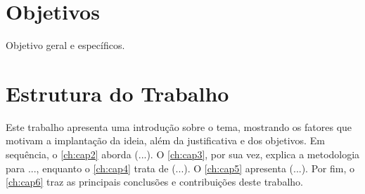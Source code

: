\section{Objetivos}
Objetivo geral e específicos.

\section{Estrutura do Trabalho}
Este trabalho apresenta uma introdução sobre o tema, mostrando os fatores que motivam a implantação da ideia, além da justificativa e dos objetivos. Em sequência, o \autoref{ch:cap2} aborda (...). O \autoref{ch:cap3}, por sua vez, explica a metodologia para ..., enquanto o \autoref{ch:cap4} trata de (...). O \autoref{ch:cap5} apresenta (...). Por fim, o \autoref{ch:cap6} traz as principais conclusões e contribuições deste trabalho.
